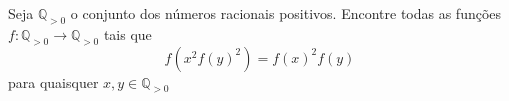 Seja $\mathbb{Q}_{>0}$ o conjunto dos números racionais positivos. Encontre todas as funções $f:\mathbb{Q}_{>0}\to \mathbb{Q}_{>0}$ tais que \[f(x^2f(y)^2)=f(x)^2f(y)\] para quaisquer $x,y\in\mathbb{Q}_{>0}$
